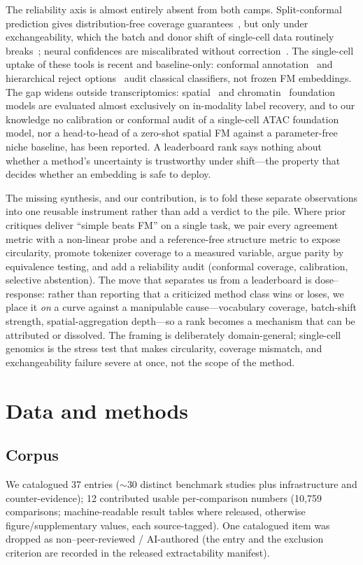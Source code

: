 \documentclass[11pt]{article}
\begin{document}
The reliability axis is almost entirely absent from both camps. Split-conformal prediction gives distribution-free coverage guarantees~\cite{vovk2005,angelopoulos2023}, but only under exchangeability, which the batch and donor shift of single-cell data routinely breaks~\cite{barber2023}; neural confidences are miscalibrated without correction~\cite{guo2017}. The single-cell uptake of these tools is recent and baseline-only: conformal annotation~\cite{lopezdecastro2025} and hierarchical reject options~\cite{theunissen2024} audit classical classifiers, not frozen FM embeddings. The gap widens outside transcriptomics: spatial~\cite{nicheformer2025} and chromatin~\cite{chromfound2025,atacformer2024,epifoundation2025} foundation models are evaluated almost exclusively on in-modality label recovery, and to our knowledge no calibration or conformal audit of a single-cell ATAC foundation model, nor a head-to-head of a zero-shot spatial FM against a parameter-free niche baseline, has been reported. A leaderboard rank says nothing about whether a method's uncertainty is trustworthy under shift---the property that decides whether an embedding is safe to deploy.

The missing synthesis, and our contribution, is to fold these separate observations into one reusable instrument rather than add a verdict to the pile. Where prior critiques deliver ``simple beats FM'' on a single task, we pair every agreement metric with a non-linear probe and a reference-free structure metric to expose circularity, promote tokenizer coverage to a measured variable, argue parity by equivalence testing, and add a reliability audit (conformal coverage, calibration, selective abstention). The move that separates us from a leaderboard is dose--response: rather than reporting that a criticized method class wins or loses, we place it \emph{on} a curve against a manipulable cause---vocabulary coverage, batch-shift strength, spatial-aggregation depth---so a rank becomes a mechanism that can be attributed or dissolved. The framing is deliberately domain-general; single-cell genomics is the stress test that makes circularity, coverage mismatch, and exchangeability failure severe at once, not the scope of the method.

\section{Data and methods}
\subsection{Corpus}
We catalogued 37 entries ($\sim$30 distinct benchmark studies plus infrastructure and counter-evidence); 12 contributed usable per-comparison numbers (10{,}759 comparisons; machine-readable result tables where released, otherwise figure/supplementary values, each source-tagged). One catalogued item was dropped as non--peer-reviewed / AI-authored (the entry and the exclusion criterion are recorded in the released extractability manifest).
\end{document}
